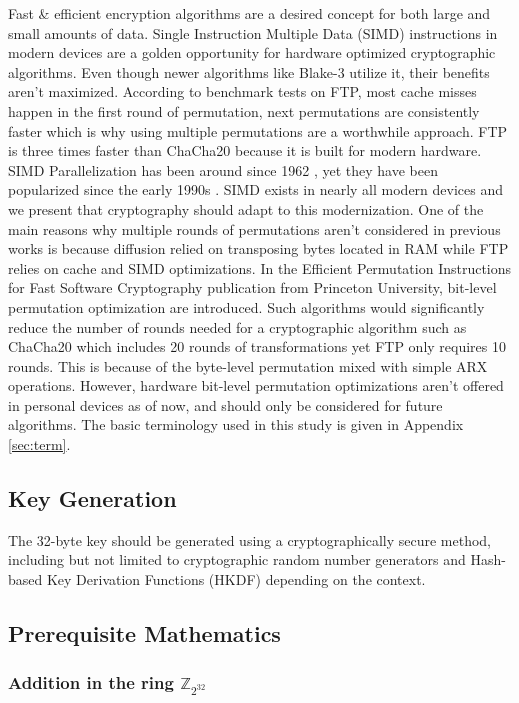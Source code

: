 \documentclass[11pt]{article}
\theoremstyle{definition}
\theoremstyle{remark}
\begin{document}
Fast \& efficient encryption algorithms are a desired concept for both large and small amounts of data. Single Instruction Multiple Data (SIMD) instructions in modern devices are a golden opportunity for hardware optimized cryptographic algorithms. Even though newer algorithms like Blake-3 utilize it, their benefits aren't maximized. According to benchmark tests on FTP, most cache misses happen in the first round of permutation, next permutations are consistently faster which is why using multiple permutations are a worthwhile approach. FTP is three times faster than ChaCha20 because it is built for modern hardware. SIMD Parallelization has been around since 1962 \cite{sung_mit_2000}, yet they have been popularized since the early 1990s \cite{wiki_simd}. SIMD exists in nearly all modern devices and we present that cryptography should adapt to this modernization. One of the main reasons why multiple rounds of permutations aren't considered in previous works is because diffusion relied on transposing bytes located in RAM while FTP relies on cache and SIMD optimizations.
In the Efficient Permutation Instructions for Fast Software Cryptography \cite{palms_princeton_2001} publication from Princeton University, bit-level permutation optimization are introduced. Such algorithms would significantly reduce the number of rounds needed for a cryptographic algorithm such as ChaCha20 which includes 20 rounds of transformations yet FTP only requires 10 rounds. This is because of the byte-level permutation mixed with simple ARX operations. However, hardware bit-level permutation optimizations aren't offered in personal devices as of now, and should only be considered for future algorithms. The basic terminology used in this study is given in Appendix \ref{sec:term}.

\subsection{Key Generation}

The 32-byte key should be generated using a cryptographically secure method, including but not limited to cryptographic random number generators and Hash-based Key Derivation Functions (HKDF) depending on the context.

\subsection{Prerequisite Mathematics}

\subsubsection{Addition in the ring $\mathbb{Z}_{2^{32}}$}
\end{document}
